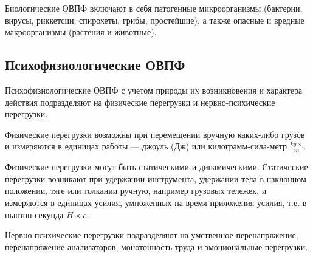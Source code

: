 Биологические ОВПФ включают в себя патогенные микроорганизмы (бактерии, вирусы, риккетсии, спирохеты, грибы, простейшие), а также опасные и вредные макроорганизмы (растения и животные).


\subsection*{Психофизиологические ОВПФ}
Психофизиологические ОВПФ с учетом природы их возникновения и характера действия подразделяют на физические перегрузки и нервно-психические перегрузки.


Физические перегрузки возможны при перемещении вручную каких-либо грузов и измеряются в единицах работы --- джоуль (Дж) или килограмм-сила-метр \(\frac{kg\times}{m}\).

Физические перегрузки могут быть статическими и динамическими. Статические перегрузки возникают при удержании инструмента, удержании тела в наклонном положении, тяге или толкании ручную, например грузовых тележек, и измеряются в единицах усилия, умноженных на время приложения усилия, т.е. в ньютон секунда \(H\times c\).


Нервно-психические перегрузки подразделяют на умственное перенапряжение, перенапряжение анализаторов, монотонность труда и эмоциональные перегрузки.